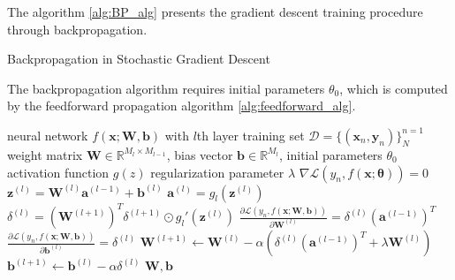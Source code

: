 \documentclass[
	parskip, 			   %
	twoside, 			   %
	DIV=14, 			   %
	BCOR=15.0mm, 		   %
	headsepline, 		   %
	open=right, 		   %
	captions=tableheading, %
	bibliography=totoc,    %
	numbers=noenddot       %
]{scrreprt}
\begin{document}
The algorithm \ref{alg:BP_alg} presents the gradient descent training procedure through backpropagation.

\clearpage
\begin{algorithm}[h!]
\caption{Backpropagation in Stochastic Gradient Descent}
The backpropagation algorithm requires initial parameters $\theta_{0}$, which is computed by the feedforward propagation algorithm \ref{alg:feedforward_alg}.
\label{alg:BP_alg}
    \begin{algorithmic}
    \Require neural network $f(\mathbf{x};\mathbf{W},\mathbf{b})$ with $l$th layer
    \Require training set $\mathcal{D}=\{(\mathbf{x}_{n}, \mathbf{y}_{n})\}_{N}^{n=1}$
    \Require weight matrix $\mathbf{W} \in \mathbb{R}^{M_{l} \times M_{l-1}}$, bias vector $\mathbf{b} \in \mathbb{R}^{M_{l}}$, initial parameters $\theta_{0}$
    \Require activation function $g(z)$
    \Require regularization parameter $\lambda$
    \Ensure $\nabla \mathcal{L}\left( y_{n},f(\mathbf{x};\mathbf{\theta}) \right) = 0$
            \State $\mathbf{z}^{(l)} = \mathbf{W}^{(l)} \mathbf{a}^{(l-1)} + \mathbf{b}^{(l)}$ 
            \State $\mathbf{a}^{(l)} = g_{l}(\mathbf{z}^{(l)})$ 
            \State {}
            \State $\delta^{(l)} = (\mathbf{W}^{(l+1)})^T \delta^{(l+1)} \odot g_{l}'(\mathbf{z}^{(l)})$ 
            \State {}
            \State $\frac{\partial \mathcal{L}\left( y_n,f(\mathbf{x};\mathbf{\mathbf{W},\mathbf{b}}) \right)}{\partial \mathbf{W}^{(l)}} = \delta^{(l)} (\mathbf{a}^{(l-1)})^T$ 
            \State $\frac{\partial \mathcal{L}\left( y_n,f(\mathbf{x};\mathbf{\mathbf{W},\mathbf{b}}) \right)}{\partial \mathbf{b}^{(l)}} = \delta^{(l)}$ 
            \State {}
            \State $\mathbf{W}^{(l+1)} \gets  \mathbf{W}^{(l)}-\alpha (\delta^{(l)} (\mathbf{a}^{(l-1)})^T + \lambda \mathbf{W}^{(l)})$ 
            \State $\mathbf{b}^{(l+1)} \gets  \mathbf{b}^{(l)}-\alpha \delta^{(l)}$ 
            \State {}
        \EndFor
    \EndFor
    \EndWhile
    \State \Return $\mathbf{W}, \mathbf{b}$ 
    \end{algorithmic}
\end{algorithm}
\end{document}
